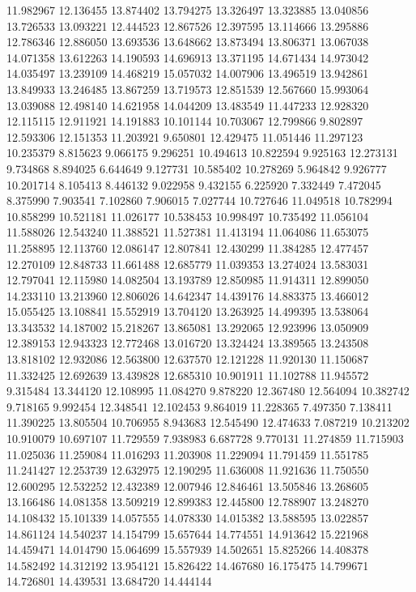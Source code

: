 11.982967
12.136455
13.874402
13.794275
13.326497
13.323885
13.040856
13.726533
13.093221
12.444523
12.867526
12.397595
13.114666
13.295886
12.786346
12.886050
13.693536
13.648662
13.873494
13.806371
13.067038
14.071358
13.612263
14.190593
14.696913
13.371195
14.671434
14.973042
14.035497
13.239109
14.468219
15.057032
14.007906
13.496519
13.942861
13.849933
13.246485
13.867259
13.719573
12.851539
12.567660
15.993064
13.039088
12.498140
14.621958
14.044209
13.483549
11.447233
12.928320
12.115115
12.911921
14.191883
10.101144
10.703067
12.799866
9.802897
12.593306
12.151353
11.203921
9.650801
12.429475
11.051446
11.297123
10.235379
8.815623
9.066175
9.296251
10.494613
10.822594
9.925163
12.273131
9.734868
8.894025
6.644649
9.127731
10.585402
10.278269
5.964842
9.926777
10.201714
8.105413
8.446132
9.022958
9.432155
6.225920
7.332449
7.472045
8.375990
7.903541
7.102860
7.906015
7.027744
10.727646
11.049518
10.782994
10.858299
10.521181
11.026177
10.538453
10.998497
10.735492
11.056104
11.588026
12.543240
11.388521
11.527381
11.413194
11.064086
11.653075
11.258895
12.113760
12.086147
12.807841
12.430299
11.384285
12.477457
12.270109
12.848733
11.661488
12.685779
11.039353
13.274024
13.583031
12.797041
12.115980
14.082504
13.193789
12.850985
11.914311
12.899050
14.233110
13.213960
12.806026
14.642347
14.439176
14.883375
13.466012
15.055425
13.108841
15.552919
13.704120
13.263925
14.499395
13.538064
13.343532
14.187002
15.218267
13.865081
13.292065
12.923996
13.050909
12.389153
12.943323
12.772468
13.016720
13.324424
13.389565
13.243508
13.818102
12.932086
12.563800
12.637570
12.121228
11.920130
11.150687
11.332425
12.692639
13.439828
12.685310
10.901911
11.102788
11.945572
9.315484
13.344120
12.108995
11.084270
9.878220
12.367480
12.564094
10.382742
9.718165
9.992454
12.348541
12.102453
9.864019
11.228365
7.497350
7.138411
11.390225
13.805504
10.706955
8.943683
12.545490
12.474633
7.087219
10.213202
10.910079
10.697107
11.729559
7.938983
6.687728
9.770131
11.274859
11.715903
11.025036
11.259084
11.016293
11.203908
11.229094
11.791459
11.551785
11.241427
12.253739
12.632975
12.190295
11.636008
11.921636
11.750550
12.600295
12.532252
12.432389
12.007946
12.846461
13.505846
13.268605
13.166486
14.081358
13.509219
12.899383
12.445800
12.788907
13.248270
14.108432
15.101339
14.057555
14.078330
14.015382
13.588595
13.022857
14.861124
14.540237
14.154799
15.657644
14.774551
14.913642
15.221968
14.459471
14.014790
15.064699
15.557939
14.502651
15.825266
14.408378
14.582492
14.312192
13.954121
15.826422
14.467680
16.175475
14.799671
14.726801
14.439531
13.684720
14.444144
